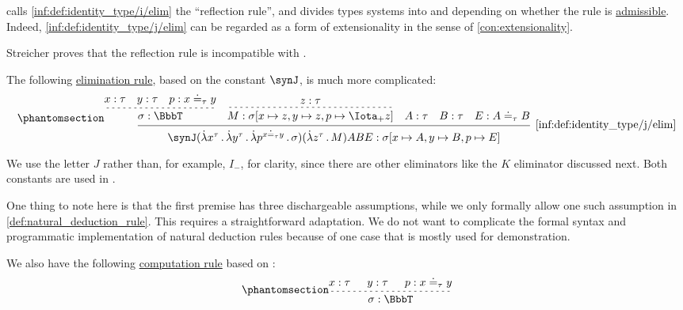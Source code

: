 \begin{definition}
\begin{thmenum}
     calls \ref{inf:def:identity_type/i/elim} the \enquote{reflection rule}, and divides types systems into  and  depending on whether the rule is \hyperref[con:inference_rule_admissibility]{admissible}. Indeed, \ref{inf:def:identity_type/j/elim} can be regarded as a form of extensionality in the sense of \cref{con:extensionality}.

    Streicher proves that the reflection rule is incompatible with .

     The following \hyperref[rem:type_theory_rule_classification/elim]{elimination rule}, based on the constant \( \synJ \), is much more complicated:
    \small
    \begin{equation*}\taglabel[\ensuremath{ =_-^J }]{inf:def:identity_type/j/elim}
      \begin{prooftree}[separation=1em]
        \hypo{ x: \tau }
        \hypo{ y: \tau }
        \hypo{ p: x \syneq_{\tau} y }
        \infer[dashed]3{ \sigma: \BbbT }

        \hypo{ z: \tau }
        \infer[dashed]1{M: \sigma[x \mapsto z, y \mapsto z, p \mapsto \Iota_+ z]}

        \hypo{ A: \tau }
        \hypo{ B: \tau }
        \hypo{ E: A \syneq_{\tau} B }

        \infer5[\ref{inf:def:identity_type/j/elim}]{ \synJ (\qabs {x^{\tau}} \qabs {y^{\tau}} \qabs {p^{x \syneq_{\tau} y}} \sigma) (\qabs {z^{\tau}} M) A B E: \sigma[x \mapsto A, y \mapsto B, p \mapsto E] }
      \end{prooftree}
    \end{equation*}
    \normalsize

    We use the letter \( J \) rather than, for example, \( I_- \), for clarity, since there are other eliminators like the \( K \) eliminator discussed next. Both constants are used in \cite[6]{Streicher1993IntensionalTypeTheory}.

    One thing to note here is that the first premise has three dischargeable assumptions, while we only formally allow one such assumption in \cref{def:natural_deduction_rule}. This requires a straightforward adaptation. We do not want to complicate the formal syntax and programmatic implementation of natural deduction rules because of one case that is mostly used for demonstration.

    We also have the following \hyperref[rem:type_theory_rule_classification/equality/comp]{computation rule} based on \cite[\S A.2.10]{UnivalentFoundationsProgram2024OctoberHoTT}:
    \small
    \begin{equation*}\taglabel[\ensuremath{ =_\beta^J }]{inf:def:identity_type/j/comp}
      \begin{prooftree}
        \hypo{ x: \tau }
        \hypo{ y: \tau }
        \hypo{ p: x \syneq_{\tau} y }
        \infer[dashed]3{\sigma: \BbbT}


\end{prooftree}
\end{equation*}
\end{thmenum}
\end{definition}
